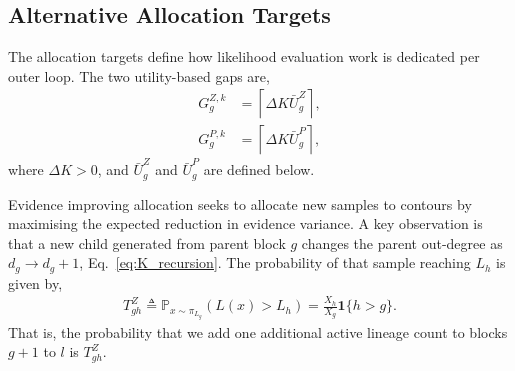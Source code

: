 \documentclass[pdflatex,sn-basic,icol]{sn-jnl}
\newcommand{\Prob}{\mathbb{P}}
\theoremstyle{plain}
\theoremstyle{definition}
\begin{document}
\begin{appendices}

\section{Alternative Allocation Targets}\label{sec:allocation_targets}
The allocation targets define how likelihood evaluation work is dedicated per outer loop.
The two utility-based gaps are,
\begin{align}
    G_g^{Z,k} &= \left\lceil\Delta K \bar{U}^Z_g\right\rceil,\\
    G_g^{P,k} &= \left\lceil\Delta K \bar{U}^P_g\right\rceil,
\end{align}
where $\Delta K > 0$, and $\bar{U}^Z_g$ and $\bar{U}^P_g$ are defined below.

Evidence improving allocation seeks to allocate new samples to contours by maximising the expected reduction in evidence variance.
A key observation is that a new child generated from parent block $g$ changes the parent out-degree as $d_g\to d_g+1$, Eq.~\ref{eq:K_recursion}.
The probability of that sample reaching $L_h$ is given by,
\begin{align}
    T^Z_{g h}
    \triangleq
    \Prob_{x\sim\pi_{L_g}}(L(x)>L_h)
    = \frac{X_h}{X_g} \mathbf{1}\{h>g\}.
    \label{eq:evidence_reach_probability}
\end{align}
That is, the probability that we add one additional active lineage count to blocks $g+1$ to $l$ is $T^Z_{g h}$.


\end{appendices}
\end{document}

